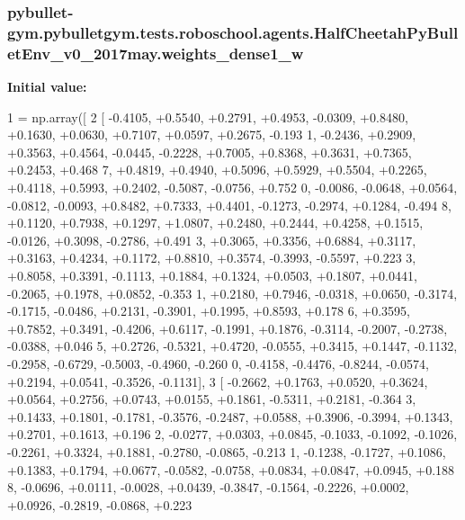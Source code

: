 \subsubsection[{\texorpdfstring{weights\+\_\+dense1\+\_\+w}{weights_dense1_w}}]{\setlength{\rightskip}{0pt plus 5cm}pybullet-\/gym.\+pybulletgym.\+tests.\+roboschool.\+agents.\+Half\+Cheetah\+Py\+Bullet\+Env\+\_\+v0\+\_\+2017may.\+weights\+\_\+dense1\+\_\+w}\hypertarget{namespacepybullet-gym_1_1pybulletgym_1_1tests_1_1roboschool_1_1agents_1_1_half_cheetah_py_bullet_env__v0__2017may_aff262af55aa48a9ff60ec19c4777d906}{}\label{namespacepybullet-gym_1_1pybulletgym_1_1tests_1_1roboschool_1_1agents_1_1_half_cheetah_py_bullet_env__v0__2017may_aff262af55aa48a9ff60ec19c4777d906}
{\bfseries Initial value\+:}
\begin{DoxyCode}
1 = np.array([
2 [ -0.4105, +0.5540, +0.2791, +0.4953, -0.0309, +0.8480, +0.1630, +0.0630, +0.7107, +0.0597, +0.2675, -0.193
      1, -0.2436, +0.2909, +0.3563, +0.4564, -0.0445, -0.2228, +0.7005, +0.8368, +0.3631, +0.7365, +0.2453, +0.468
      7, +0.4819, +0.4940, +0.5096, +0.5929, +0.5504, +0.2265, +0.4118, +0.5993, +0.2402, -0.5087, -0.0756, +0.752
      0, -0.0086, -0.0648, +0.0564, -0.0812, -0.0093, +0.8482, +0.7333, +0.4401, -0.1273, -0.2974, +0.1284, -0.494
      8, +0.1120, +0.7938, +0.1297, +1.0807, +0.2480, +0.2444, +0.4258, +0.1515, -0.0126, +0.3098, -0.2786, +0.491
      3, +0.3065, +0.3356, +0.6884, +0.3117, +0.3163, +0.4234, +0.1172, +0.8810, +0.3574, -0.3993, -0.5597, +0.223
      3, +0.8058, +0.3391, -0.1113, +0.1884, +0.1324, +0.0503, +0.1807, +0.0441, -0.2065, +0.1978, +0.0852, -0.353
      1, +0.2180, +0.7946, -0.0318, +0.0650, -0.3174, -0.1715, -0.0486, +0.2131, -0.3901, +0.1995, +0.8593, +0.178
      6, +0.3595, +0.7852, +0.3491, -0.4206, +0.6117, -0.1991, +0.1876, -0.3114, -0.2007, -0.2738, -0.0388, +0.046
      5, +0.2726, -0.5321, +0.4720, -0.0555, +0.3415, +0.1447, -0.1132, -0.2958, -0.6729, -0.5003, -0.4960, -0.260
      0, -0.4158, -0.4476, -0.8244, -0.0574, +0.2194, +0.0541, -0.3526, -0.1131],
3 [ -0.2662, +0.1763, +0.0520, +0.3624, +0.0564, +0.2756, +0.0743, +0.0155, +0.1861, -0.5311, +0.2181, -0.364
      3, +0.1433, +0.1801, -0.1781, -0.3576, -0.2487, +0.0588, +0.3906, -0.3994, +0.1343, +0.2701, +0.1613, +0.196
      2, -0.0277, +0.0303, +0.0845, -0.1033, -0.1092, -0.1026, -0.2261, +0.3324, +0.1881, -0.2780, -0.0865, -0.213
      1, -0.1238, -0.1727, +0.1086, +0.1383, +0.1794, +0.0677, -0.0582, -0.0758, +0.0834, +0.0847, +0.0945, +0.188
      8, -0.0696, +0.0111, -0.0028, +0.0439, -0.3847, -0.1564, -0.2226, +0.0002, +0.0926, -0.2819, -0.0868, +0.223

\end{DoxyCode}
